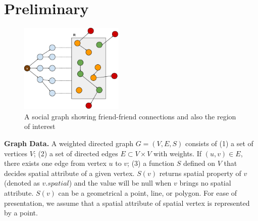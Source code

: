 \section{Preliminary}
\label{sec:preliminary}

\begin{figure}[h]
	\centering
	\includegraphics[width=0.44\textwidth]{images/a_social_graph.eps}
	\caption{A social graph showing friend-friend connections and also the region of interest}
	\label{fig:socio-spatial-graph}
\end{figure}

{\bf Graph Data.} A weighted directed graph $G=(V,E,S)$ consists of (1) a set of vertices $V$; (2) a set of directed edges $E\subset V\times V$ with weights. If $(u,v)\in E$, there exists one edge from vertex $u$ to $v$; (3) a function $S$ defined on $V$ that decides spatial attribute of a given vertex. $S(v)$ returns spatial property of $v$ (denoted as $v.spatial$) and the value will be null when $v$ brings no spatial attribute. $S(v)$ can be a geometrical a point, line, or polygon. For ease of presentation, we assume that a spatial attribute of spatial vertex is represented by a point.

